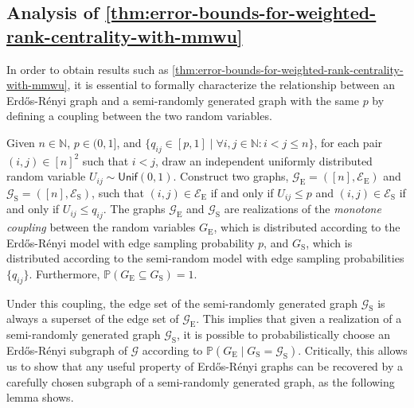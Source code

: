 \documentclass[sigconf,nonacm,pbalance]{acmart}
\begin{document}
\subsection{Analysis of \cref{thm:error-bounds-for-weighted-rank-centrality-with-mmwu}}
In order to obtain results such as \cref{thm:error-bounds-for-weighted-rank-centrality-with-mmwu}, it is essential to formally characterize the relationship between an Erd\H{o}s-R\'{e}nyi graph and a semi-randomly generated graph with the same $p$ by defining a coupling between the two random variables.
\begin{definition}\label{def:maximal-coupling}
Given $n\in\mathbb{N}$, $p \in (0, 1]$, and $\{q_{ij} \in [p, 1] \mid \forall i,j\in\mathbb{N}: i<j\leq n\}$, for each pair $(i, j) \in [n]^2$ such that $i < j$, draw an independent uniformly distributed random variable $U_{ij} \sim \textsf{Unif}(0, 1)$. Construct two graphs, $\mathcal{G}_\text{E}=([n], \mathcal{E}_\text{E})$ and $\mathcal{G}_\text{S}=([n], \mathcal{E}_\text{S})$, such that $(i, j) \in \mathcal{E}_\text{E}$ if and only if $U_{ij} \leq p$ and $(i, j) \in \mathcal{E}_\text{S}$ if and only if $U_{ij} \leq q_{ij}$. The graphs $\mathcal{G}_\text{E}$ and $\mathcal{G}_\text{S}$ are realizations of the \emph{monotone coupling} between the random variables $G_\text{E}$, which is distributed according to the Erd\H{o}s-R\'{e}nyi model with edge sampling probability $p$, and $G_\text{S}$, which is distributed according to the semi-random model with edge sampling probabilities $\{q_{ij}\}$. Furthermore, $\mathbb{P}(G_\text{E} \subseteq G_\text{S})=1$. 
\end{definition}
Under this coupling, the edge set of the semi-randomly generated graph $\mathcal{G}_\text{S}$ is always a superset of the edge set of $\mathcal{G}_\text{E}$. This implies that given a realization of a semi-randomly generated graph $\mathcal{G}_\text{S}$, it is possible to probabilistically choose an Erd\H{o}s-R\'{e}nyi subgraph of $\mathcal{G}$ according to $\mathbb{P}(G_\text{E} \mid G_\text{S} = \mathcal{G}_\text{S})$. Critically, this allows us to show that any useful property of Erd\H{o}s-R\'{e}nyi graphs can be recovered by a carefully chosen subgraph of a semi-randomly generated graph, as the following lemma shows.
\end{document}
